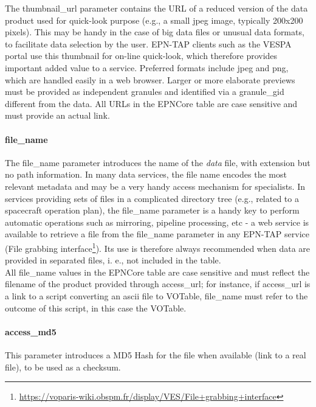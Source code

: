 \documentclass[11pt,a4paper]{ivoa}
\begin{document}
The thumbnail\_url parameter contains the URL of a reduced version of the data product used for quick-look purpose (e.g., a small jpeg image, typically 200x200 pixels). This may be handy in the case of big data files or unusual data formats, to facilitate data selection by the user. EPN-TAP clients such as the VESPA portal use this thumbnail for on-line quick-look, which therefore provides important added value to a service. Preferred formats include jpeg and png, which are handled easily in a web browser. Larger or more elaborate previews must be provided as independent granules and identified via a granule\_gid different from the data. All URLs in the EPNCore table are case sensitive and must provide an actual link.

\paragraph{file\_name}

The file\_name parameter introduces the name of the \emph{data} file, with extension but no path information. In many data services, the file name encodes the most relevant metadata and may be a very handy access mechanism for specialists. In services providing sets of files in a complicated directory tree (e.g., related to a spacecraft operation plan), the file\_name parameter is a handy key to perform automatic operations such as mirroring, pipeline processing, etc - a web service is available to retrieve a file from the file\_name parameter in any EPN-TAP service (File grabbing interface\footnote{\url{https://voparis-wiki.obspm.fr/display/VES/File+grabbing+interface}}). Its use is therefore always recommended when data are provided in separated files, i. e., not included in the table.\\All file\_name values in the EPNCore table are case sensitive and must reflect the filename of the product provided through access\_url; for instance, if access\_url is a link to a script converting an ascii file to VOTable, file\_name must refer to the outcome of this script, in this case the VOTable.

\paragraph{access\_md5}

This parameter introduces a MD5 Hash for the file when available (link to a real file), to be used as a checksum.\\
\end{document}
